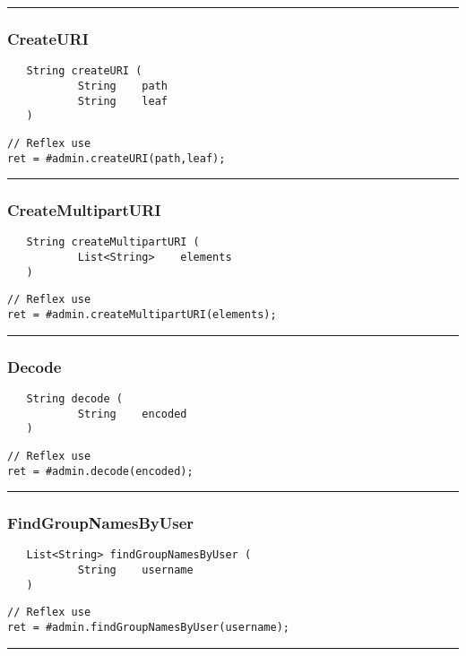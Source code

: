 \rule{15cm}{2pt}
\subsubsection{CreateURI}
\label{Api:CreateURI}
\begin{verbatim}
   String createURI (
           String    path
           String    leaf
   )
\end{verbatim}
\begin{lstlisting}[language=reflex]
// Reflex use
ret = #admin.createURI(path,leaf);
\end{lstlisting}



\rule{15cm}{2pt}
\subsubsection{CreateMultipartURI}
\label{Api:CreateMultipartURI}
\begin{verbatim}
   String createMultipartURI (
           List<String>    elements
   )
\end{verbatim}
\begin{lstlisting}[language=reflex]
// Reflex use
ret = #admin.createMultipartURI(elements);
\end{lstlisting}



\rule{15cm}{2pt}
\subsubsection{Decode}
\label{Api:Decode}
\begin{verbatim}
   String decode (
           String    encoded
   )
\end{verbatim}
\begin{lstlisting}[language=reflex]
// Reflex use
ret = #admin.decode(encoded);
\end{lstlisting}



\rule{15cm}{2pt}
\subsubsection{FindGroupNamesByUser}
\label{Api:FindGroupNamesByUser}
\begin{verbatim}
   List<String> findGroupNamesByUser (
           String    username
   )
\end{verbatim}
\begin{lstlisting}[language=reflex]
// Reflex use
ret = #admin.findGroupNamesByUser(username);
\end{lstlisting}



\rule{15cm}{2pt}
